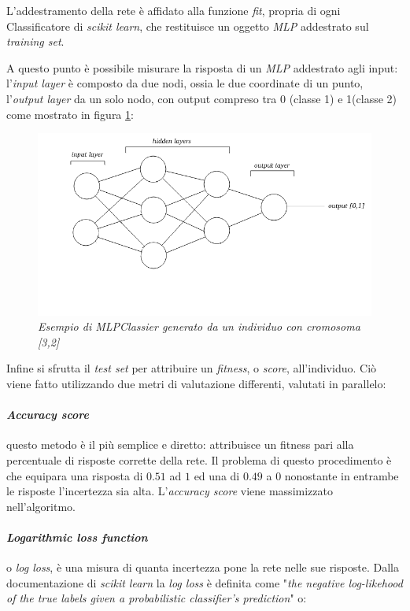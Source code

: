 \documentclass[12pt,a4paper]{report}
\begin{document}
L'addestramento della rete è affidato alla funzione \textit{fit}, propria di ogni Classificatore di \textit{scikit learn}, che restituisce un oggetto \textit{MLP} addestrato sul \textit{training set}.

A questo punto è possibile misurare la risposta di un \textit{MLP} addestrato agli input: l'\textit{input layer} è composto da due nodi, ossia le due coordinate di un punto, l'\textit{output layer} da un solo nodo, con output compreso tra 0 (classe 1) e 1(classe 2) come mostrato in figura \ref{MLP}:

\begin{figure}[H]
 \centering
 \includegraphics[scale = 0.55]{images/MLPClass}
 \caption {\textit{Esempio di MLPClassier generato da un individuo con cromosoma [3,2]}}
 \label{MLP}
\end{figure}

Infine si sfrutta il \textit{test set} per attribuire un \textit{fitness}, o \textit{score}, all'individuo.
Ciò viene fatto utilizzando due metri di valutazione differenti, valutati in parallelo: 

\paragraph{\textit{Accuracy score}} questo metodo è il più semplice e diretto: attribuisce un fitness pari alla percentuale di risposte corrette della rete. Il problema di questo procedimento è che equipara una risposta di $0.51$ ad $1$ ed una di $0.49$ a $0$ nonostante in entrambe le risposte l'incertezza sia alta.
L'\textit{accuracy score} viene massimizzato nell'algoritmo.

\paragraph{\textit{Logarithmic loss function}} o \textit{log loss}, è una misura di quanta incertezza pone la rete nelle sue risposte. Dalla documentazione di \textit{scikit learn} la \textit{log loss} è definita come "\textit{the negative log-likehood of the true labels given a probabilistic classifier's prediction}" o:  
\end{document}
